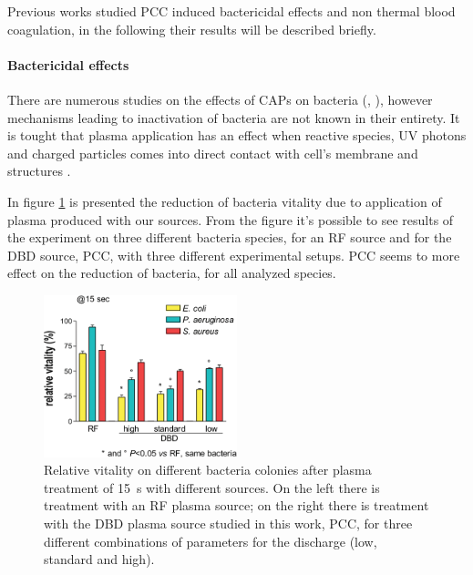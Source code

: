 Previous works studied PCC induced bactericidal effects and non thermal blood coagulation, in the following their results will be described briefly.

\paragraph{Bactericidal effects}
There are numerous studies on the effects of CAPs on bacteria (\cite{1167632}, \cite{1673530}), however mechanisms leading to inactivation of bacteria are not known in their entirety. It is tought that plasma application has an effect when reactive species, UV photons and charged particles comes into direct contact with cell's membrane and structures \cite{plmed_review}.

In figure \ref{fig:bact} is presented the reduction of bacteria vitality due to application of plasma produced with our sources. From the figure it's possible to see results of the experiment on three different bacteria species, for an RF source and for the DBD source, PCC, with three different experimental setups. PCC seems to more effect on the reduction of bacteria, for all analyzed species. 
\begin{figure}
 \centering
 \includegraphics[width=0.5\textwidth]{Images/Intro/bacteria2.png}
 \caption{Relative vitality on different bacteria colonies after plasma treatment of \SI{15}{\second} with different sources. On the left there is treatment with an RF plasma source; on the right there is treatment with the DBD plasma source studied in this work, PCC, for three different combinations of parameters for the discharge (low, standard and high).}
 \label{fig:bact}
\end{figure}


